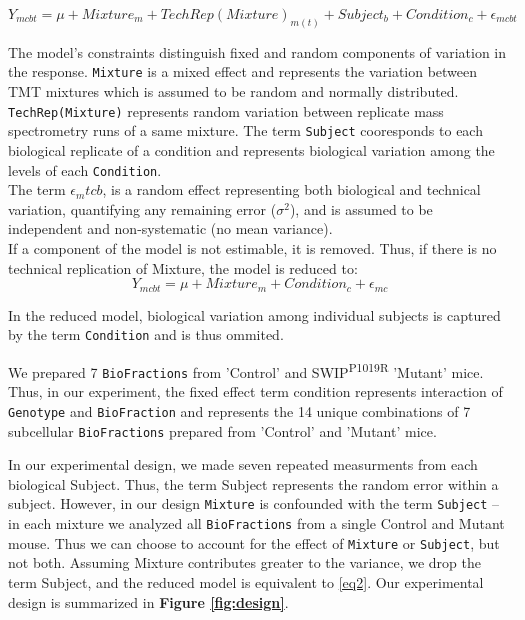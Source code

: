 \documentclass[11pt]{elife}\usepackage[]{graphicx}\usepackage[]{color}
\begin{document}
\begin{equation} \label{eq1}
	Y_{mcbt} = \mu + Mixture_m + TechRep(Mixture)_{m(t)} + Subject_b + 
	Condition_c + \epsilon_{mcbt}
\end{equation}

The model's constraints distinguish fixed and random components of 
variation in the response. \texttt{Mixture} is a mixed effect and 
represents the variation between TMT mixtures which is assumed to be random 
and normally distributed. \texttt{TechRep(Mixture)} represents random variation 
between replicate mass spectrometry runs of a same mixture. 
The term \texttt{Subject} cooresponds to each biological replicate of a 
condition and represents biological variation among the levels of each 
\texttt{Condition}. \\

The term $\epsilon_mtcb$,
is a random effect representing both biological and technical variation, 
quantifying any remaining error ($\sigma^2$), and is assumed to be independent 
and non-systematic (no mean variance). \\

If a component of the model is not estimable, it is removed. Thus, if there is
no technical replication of Mixture, the model is reduced to: \\

\begin{equation} \label{eq2}
	Y_{mcbt} = \mu + Mixture_m + Condition_c + \epsilon_{mc}
\end{equation}

In the reduced model, biological variation among individual subjects is 
captured by the term \texttt{Condition} and is thus ommited.

We prepared 7 \texttt{BioFractions} from 'Control' and 
SWIP\textsuperscript{P1019R} 'Mutant' mice. Thus, in our experiment, 
the fixed effect term condition represents interaction of \texttt{Genotype} and 
\texttt{BioFraction} and represents the 14 unique combinations 
of 7 subcellular \texttt{BioFractions} prepared from 'Control' and 'Mutant' mice. 

In our experimental design, we made seven repeated measurments 
from each biological Subject. Thus, the term Subject represents the random error
within a subject. However, in our design \texttt{Mixture} is confounded with the
term \texttt{Subject} -- in each mixture we analyzed all \texttt{BioFractions} 
from a single Control and Mutant mouse. Thus we can choose to account for the 
effect of \texttt{Mixture} or \texttt{Subject}, but not both. 
Assuming Mixture contributes greater to the variance, we drop the term Subject,
and the reduced model is equivalent  to \ref{eq2}. Our experimental design is 
summarized in \textbf{Figure \ref{fig:design}}.
\end{document}
